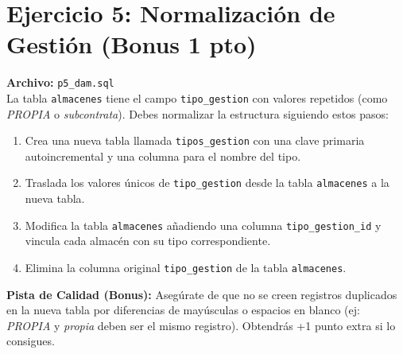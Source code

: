 \documentclass[12pt,a4paper]{article}
\begin{document}
\section{Ejercicio 5: Normalización de Gestión (Bonus 1 pto)}
\textbf{Archivo:} \texttt{p5\_dam.sql} \\
La tabla \texttt{almacenes} tiene el campo \texttt{tipo\_gestion} con valores repetidos (como \textit{PROPIA} o \textit{subcontrata}). Debes normalizar la estructura siguiendo estos pasos:
\begin{enumerate}
    \item Crea una nueva tabla llamada \texttt{tipos\_gestion} con una clave primaria autoincremental y una columna para el nombre del tipo.
    \item Traslada los valores únicos de \texttt{tipo\_gestion} desde la tabla \texttt{almacenes} a la nueva tabla.
    \item Modifica la tabla \texttt{almacenes} añadiendo una columna \texttt{tipo\_gestion\_id} y vincula cada almacén con su tipo correspondiente.
    \item Elimina la columna original \texttt{tipo\_gestion} de la tabla \texttt{almacenes}.
\end{enumerate}
\textbf{Pista de Calidad (Bonus):} Asegúrate de que no se creen registros duplicados en la nueva tabla por diferencias de mayúsculas o espacios en blanco (ej: \textit{PROPIA} y \textit{propia} deben ser el mismo registro). Obtendrás +1 punto extra si lo consigues.
\end{document}

